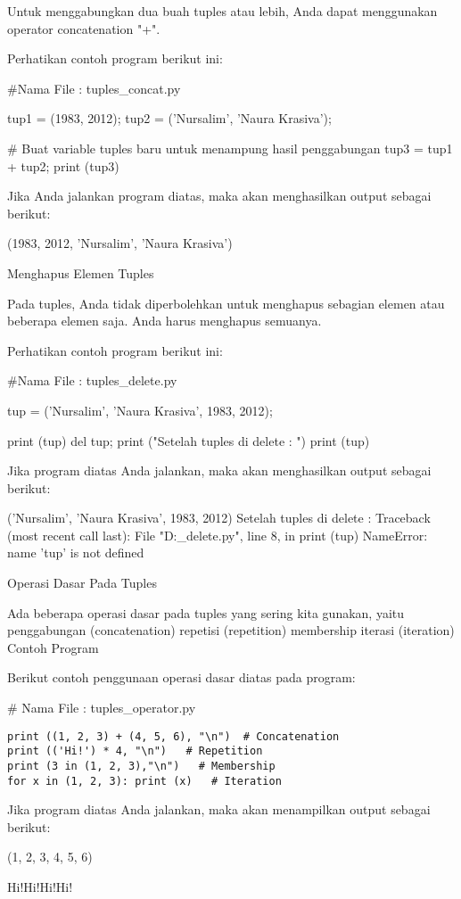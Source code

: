 Untuk menggabungkan dua buah tuples atau lebih, Anda dapat menggunakan operator concatenation "+".

Perhatikan contoh program berikut ini:

#Nama File : tuples_concat.py

tup1 = (1983, 2012);
tup2 = ('Nursalim', 'Naura Krasiva');

# Buat variable tuples baru untuk menampung hasil penggabungan
tup3 = tup1 + tup2;
print (tup3)

Jika Anda jalankan program diatas, maka akan menghasilkan output sebagai berikut:

(1983, 2012, 'Nursalim', 'Naura Krasiva')

Menghapus Elemen Tuples


Pada tuples, Anda tidak diperbolehkan untuk menghapus sebagian elemen atau beberapa elemen saja. Anda harus menghapus semuanya.

Perhatikan contoh program berikut ini:

#Nama File : tuples_delete.py

tup = ('Nursalim', 'Naura Krasiva', 1983, 2012);

print (tup)
del tup;
print ("Setelah tuples di delete : ")
print (tup)


Jika program diatas Anda jalankan, maka akan menghasilkan output sebagai berikut: 

('Nursalim', 'Naura Krasiva', 1983, 2012)
Setelah tuples di delete : 
Traceback (most recent call last):
  File "D:\python\tuples_delete.py", line 8, in 
    print (tup)
NameError: name 'tup' is not defined

Operasi Dasar Pada Tuples


Ada beberapa operasi dasar pada tuples yang sering kita gunakan, yaitu
penggabungan (concatenation)
repetisi (repetition)
membership
iterasi (iteration)
Contoh Program

Berikut contoh penggunaan operasi dasar diatas pada program:

\# Nama File : tuples_operator.py
\begin{verbatim}
print ((1, 2, 3) + (4, 5, 6), "\n")  # Concatenation
print (('Hi!') * 4, "\n")   # Repetition
print (3 in (1, 2, 3),"\n")   # Membership
for x in (1, 2, 3): print (x)   # Iteration
\end{verbatim}
Jika program diatas Anda jalankan, maka akan menampilkan output sebagai berikut:

(1, 2, 3, 4, 5, 6) 

Hi!Hi!Hi!Hi! 

